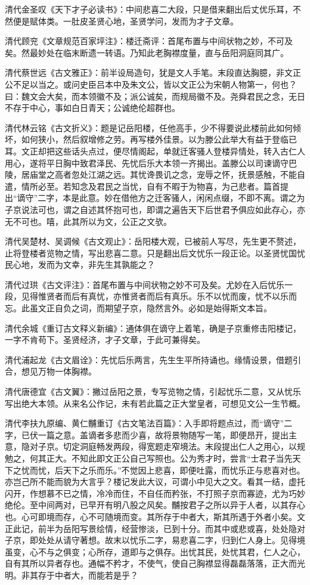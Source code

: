 \documentclass[letterpaper,10pt,english]{sphinxmanual}
\begin{document}
清代金圣叹《天下才子必读书》：中间悲喜二大段，只是借来翻出后丈优乐耳，不然便是赋体类。一肚皮圣贤心地，圣贤学问，发而为才子文章。

清代顾兖《文章规范百家坪注》：楼迁斋评：首尾布置与中间状物之妙，不可及矣。然最妙处在临末断遗一转语。乃知此老胸襟度量，直与岳阳洞庭同其广。

清代蔡世远《古文雅正》：前半设局造句，犹是文人手笔。末段直达胸臆，非文正公不足以当之。或问史臣吕本中及朱文公，皆以文正公为宋朝人物第一，何也？曰：魏文会大矣，而本领徽不及；派公诚矣，而规局徽不及。尧舜君民之念，无日不存于中心，事如白日青天；公诚绝伦超群也。

清代林云铭《古文折义》：题是记岳阳楼，任他高手，少不得要说此楼前此如何倾坏，如何狭小，然后叙增修之劳。再写楼外佳景。以为滕公此举大有益于登临已耳。文正却把这些话头点过，便尽情阁起，单就迁客骚人登楼异情处，转入古仁人用心，遂将平日胸中致君泽民、先忧后乐大本领一齐揭出。盖滕公以司谏谪守巴陵，居庙堂之高者忽处江湖之远。其忧谗畏讥之念，宠辱之怀，抚景感触，不能自遣，情所必至。若知念及君民之当忧，自有不暇于为物喜，为己悲者。篇首提出“谪守”二字，本是此意。妙在借他方之迁客骚人，闲闲点缀，不即不离。谓之为子京说法可也，谓之自述其怀抱可也，即谓之遍告天下后世君予俱应如此存心，亦无不可也。嘻，此其所以为文，公正之文欤。

清代吴楚材、吴调候《古文观止》：岳阳楼大观，已被前人写尽，先生更不赘述，止将登楼者览物之情，写出悲喜二意。只是翻出后文忧乐一段正论。以圣贤忧国忧民心地，发而为文幸，非先生其孰能之？

清代过珙《古文评注》：首尾布置与中间状物之妙不可及矣。尤妙在入后忧乐一段，见得惟贤者而后有真忧，亦惟贤者而后有真乐。乐不以忧而废，忧不以乐而忘。此虽文正自负之词，而期望子京，隐然言外。必如是始得斯文本旨。

清代余城《重订古文释义新编》：通体俱在谪守上着笔，确是子京重修击阳楼记，一字不肯苟下。圣贤经济，才子文章，于此可兼得矣。

清代浦起龙《古文眉诠》：先忧后乐两言，先生生平所持诵也。缘情设景，借题引合，想见万物一体胸襟。

清代唐德宜《古文翼》：撇过岳阳之景，专写览物之情，引起忧乐二意，又从忧乐写出绝大本领。从来名公作记，未有若此篇之正大堂皇者，可想见文公一生节概。

清代李扶九原编、黄仁黼重订《古文笔法百篇》：入手即将题点过，而“谪守”二字，已伏一篇之意。盖谪者多悲而少喜，故将景物随写一笔，即便昂开，提出主意，隐对子京。切定洞庭畅发两段，得宽题走窄境法。末段提出仁人之用心，以规勉之，何其正大。不知此即文正公自己写照也。公为秀才时，尝言“士君子当先天下之忧而忧，后天下之乐而乐。”不觉因上悲喜，即便吐露，而忧乐正与悲喜对也。亦岂己所不能而貌为大言乎？楼记发此大议，可谓小中见大之文。看其一结，虚托闪开，作想慕不已之情，冷冷而住，不自任而矜张，不打照子京而寡迹，尤为巧妙绝伦。至中间两对，已早开有明八股之风矣。黼按君子之所以异于人者，以其存心也。心可即境而存，心不可随境而变。其所存于中者大，斯其所遇于外者小矣。文正此记，前半为岳阳写景绘情，经营惨淡，已到十分。而其中或悲或喜，处处隐对子京，即处处从请守著想。故末以忧乐二字，易悲喜二字，归到仁人身上。见得境虽变，心不与之俱变；心所存，道即与之俱存。出忧其民，处忧其君，仁人之心，自有其所以异者存也。通幅不矜才，不使气，使自己胸襟显得磊磊落落，正大而光明。非其存于中者大，而能若是乎？
\end{document}
